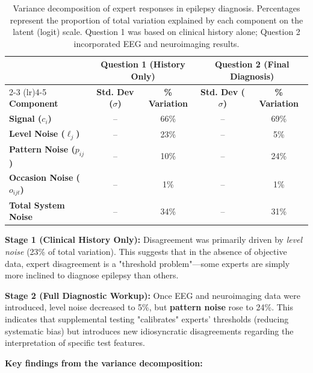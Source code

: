 \documentclass[num-refs]{wiley-article}
\begin{document}
\begin{table}[h!]
\centering
\small
\begin{tabular}{lcccc}
\toprule
& \multicolumn{2}{c}{\textbf{Question 1 (History Only)}} & \multicolumn{2}{c}{\textbf{Question 2 (Final Diagnosis)}} \\
\cmidrule(lr){2-3} \cmidrule(lr){4-5}
\textbf{Component} & \textbf{Std. Dev ($\sigma$)} & \textbf{\% Variation} & \textbf{Std. Dev ($\sigma$)} & \textbf{\% Variation} \\
\midrule
\textbf{Signal ($c_i$)} & -- & 66\% & -- & 69\%  \\
\textbf{Level Noise ($\ell_j$)} & -- & 23\% & -- & 5\%  \\
\textbf{Pattern Noise ($p_{ij}$)} & -- & 10\% & -- & 24\%  \\
\textbf{Occasion Noise ($o_{ijt}$)} & -- & 1\% & -- & 1\%  \\
\midrule
\textbf{Total System Noise} & -- & 34\% & -- & 31\%  \\
\bottomrule
\end{tabular}
\caption{Variance decomposition of expert responses in epilepsy diagnosis. Percentages represent the proportion of total variation explained by each component on the latent (logit) scale. Question 1 was based on clinical history alone; Question 2 incorporated EEG and neuroimaging results.}
\label{tab:variance-results}
\end{table}

\textbf{Stage 1 (Clinical History Only):} Disagreement was primarily driven by \textit{level noise} (23\% of total variation). This suggests that in the absence of objective data, expert disagreement is a "threshold problem"---some experts are simply more inclined to diagnose epilepsy than others.

\textbf{Stage 2 (Full Diagnostic Workup):} Once EEG and neuroimaging data were introduced, level noise decreased to 5\%, but \textbf{pattern noise} rose to 24\%. This indicates that supplemental testing "calibrates" experts' thresholds (reducing systematic bias) but introduces new idiosyncratic disagreements regarding the interpretation of specific test features.

\textbf{Key findings from the variance decomposition:}
\end{document}
